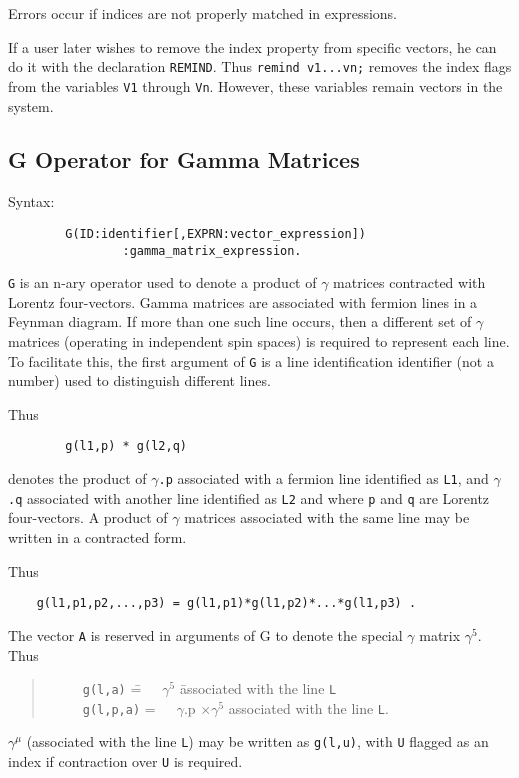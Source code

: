 Errors occur if indices are not properly matched in expressions.

If a user later wishes to remove the index property from specific vectors,
he can do it with the declaration {\tt REMIND}. Thus
{\tt remind v1...vn;} removes the index flags from the variables {\tt V1}
through {\tt Vn}.  However, these variables remain vectors in the system.

\subsection{G Operator for Gamma Matrices}

Syntax:
\begin{verbatim}
        G(ID:identifier[,EXPRN:vector_expression])
                :gamma_matrix_expression.
\end{verbatim}
{\tt G} is an n-ary operator used to denote a product of $\gamma$ matrices
contracted with Lorentz four-vectors. Gamma matrices are associated with
fermion lines in a Feynman diagram. If more than one such line occurs,
then a different set of $\gamma$ matrices (operating in independent spin
spaces) is required to represent each line. To facilitate this, the first
argument of {\tt G} is a line identification identifier (not a number)
used to distinguish different lines.

Thus
\begin{verbatim}
        g(l1,p) * g(l2,q)
\end{verbatim}
denotes the product of {\tt $\gamma$.p} associated with a fermion line
identified as {\tt L1}, and {\tt $\gamma$.q} associated with another line
identified as {\tt L2} and where {\tt p} and {\tt q} are Lorentz
four-vectors.  A product of $\gamma$ matrices associated with the same
line may be written in a contracted form.

Thus
\begin{verbatim}
	g(l1,p1,p2,...,p3) = g(l1,p1)*g(l1,p2)*...*g(l1,p3) .
\end{verbatim}
The vector {\tt A} is reserved in arguments of G to denote the special
$\gamma$ matrix $\gamma^{5}$. Thus
\begin{quote}
\begin{tabbing}
\ \ \ \ \ {\tt g(l,a)}\hspace{0.2in} \= =\ \ \  $\gamma^{5}$ \hspace{0.5in}
\= associated with the line {\tt L} \\[0.1in]
\ \ \ \ \ {\tt g(l,p,a)} \> =\ \ \  $\gamma$.p $\times \gamma^{5}$ \>
associated with the line {\tt L}.
\end{tabbing}
\end{quote}
$\gamma^{\mu}$ (associated with the line {\tt L}) may be written as
{\tt g(l,u)}, with {\tt U} flagged as an index if contraction over {\tt U}
is required.

